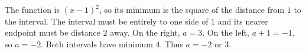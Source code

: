 The function is $(x-1)^2$, so its minimum is the square of the distance from $1$ to the interval. The interval must be entirely to one side of $1$ and its nearer endpoint must be distance $2$ away. On the right, $a=3$. On the left, $a+1=-1$, so $a=-2$. Both intervals have minimum $4$. Thus $\boxed{a=-2\text{ or }3}$.
